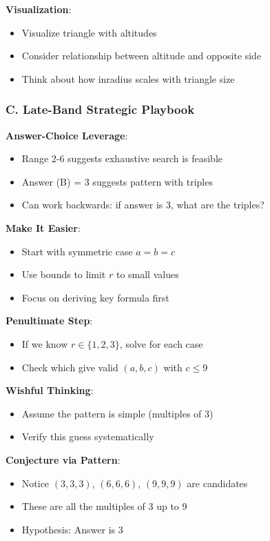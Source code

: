 \documentclass[12pt]{article}
\begin{document}
\begin{strategicbox}
\textbf{Visualization}:
\begin{itemize}
    \item Visualize triangle with altitudes
    \item Consider relationship between altitude and opposite side
    \item Think about how inradius scales with triangle size
\end{itemize}

\subsubsection*{C. Late-Band Strategic Playbook}

\textbf{Answer-Choice Leverage}:
\begin{itemize}
    \item Range 2-6 suggests exhaustive search is feasible
    \item Answer (B) = 3 suggests pattern with triples
    \item Can work backwards: if answer is 3, what are the triples?
\end{itemize}

\textbf{Make It Easier}:
\begin{itemize}
    \item Start with symmetric case $a = b = c$
    \item Use bounds to limit $r$ to small values
    \item Focus on deriving key formula first
\end{itemize}

\textbf{Penultimate Step}:
\begin{itemize}
    \item If we know $r \in \{1, 2, 3\}$, solve for each case
    \item Check which give valid $(a, b, c)$ with $c \leq 9$
\end{itemize}

\textbf{Wishful Thinking}:
\begin{itemize}
    \item Assume the pattern is simple (multiples of 3)
    \item Verify this guess systematically
\end{itemize}

\textbf{Conjecture via Pattern}:
\begin{itemize}
    \item Notice $(3, 3, 3)$, $(6, 6, 6)$, $(9, 9, 9)$ are candidates
    \item These are all the multiples of 3 up to 9
    \item Hypothesis: Answer is 3
\end{itemize}

\end{strategicbox}
\end{document}
